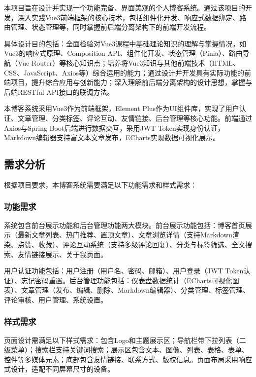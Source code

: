 \documentclass[12pt,a4paper]{article}
\begin{document}
本项目旨在设计并实现一个功能完备、界面美观的个人博客系统。通过该项目的开发，深入实践Vue3前端框架的核心技术，包括组件化开发、响应式数据绑定、路由管理、状态管理等，同时掌握前后端分离架构下的前端开发流程。

具体设计目的包括：全面检验对Vue3课程中基础理论知识的理解与掌握情况，如Vue3的响应式原理、Composition API、组件化开发、状态管理（Pinia）、路由导航（Vue Router）等核心知识点；培养将Vue3知识与其他前端技术（HTML、CSS、JavaScript、Axios等）综合运用的能力；通过设计并开发具有实际功能的前端项目，提升综合应用与创新能力；深入理解前后端分离架构的设计思想，掌握与后端RESTful API接口的联调方法。

本博客系统采用Vue3作为前端框架，Element Plus作为UI组件库，实现了用户认证、文章管理、分类标签、评论互动、友情链接、后台管理等核心功能。前端通过Axios与Spring Boot后端进行数据交互，采用JWT Token实现身份认证，Markdown编辑器支持富文本文章发布，ECharts实现数据可视化展示。

\subsection{需求分析}

根据项目要求，本博客系统需要满足以下功能需求和样式需求：

\subsubsection{功能需求}

系统包含前台展示功能和后台管理功能两大模块。前台展示功能包括：博客首页展示（最新文章列表、热门推荐、置顶文章）、文章浏览详情（支持Markdown渲染、点赞、收藏）、评论互动系统（支持多级评论回复）、分类与标签筛选、全文搜索、友情链接展示、关于我页面。

用户认证功能包括：用户注册（用户名、密码、邮箱）、用户登录（JWT Token认证）、忘记密码重置。后台管理功能包括：仪表盘数据统计（ECharts可视化图表）、文章管理（发布、编辑、删除、Markdown编辑器）、分类管理、标签管理、评论审核、用户管理、系统设置。

\subsubsection{样式需求}

页面设计需满足以下样式需求：包含Logo和主题展示区；导航栏带下拉列表（二级菜单）；搜索栏支持关键词搜索；展示区包含文本、图像、列表、表格、表单、控件等多媒体元素；底部包含友情链接、联系方式、版权信息。页面布局采用响应式设计，适配不同屏幕尺寸的设备。
\end{document}
